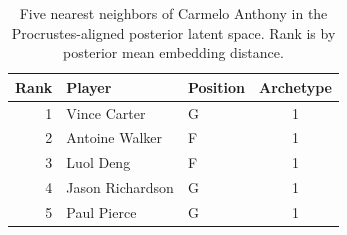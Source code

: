 \begin{table}[htbp]
  \centering\small
  \begin{tabular}{rllc}
    \toprule
    Rank & Player & Position & Archetype \\
    \midrule
    1 & Vince Carter & G & 1 \\
    2 & Antoine Walker & F & 1 \\
    3 & Luol Deng & F & 1 \\
    4 & Jason Richardson & G & 1 \\
    5 & Paul Pierce & G & 1 \\
    \bottomrule
  \end{tabular}
  \caption{Five nearest neighbors of Carmelo Anthony in the Procrustes-aligned posterior latent space. Rank is by posterior mean embedding distance.}
  \label{tab:Carmelo_Anthony_neighbors}
\end{table}

